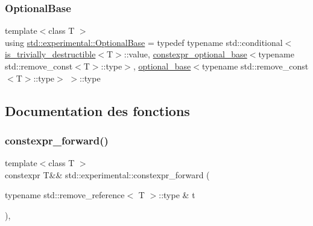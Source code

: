 \subsubsection{\texorpdfstring{Optional\+Base}{OptionalBase}}
{\footnotesize\ttfamily template$<$class T $>$ \\
using \hyperlink{namespacestd_1_1experimental_a33aa5e258a2b0762197365c1ef3f90aa}{std\+::experimental\+::\+Optional\+Base} = typedef typename std\+::conditional$<$ \hyperlink{namespacestd_1_1experimental_a481cc29b2f00961d0afc189e6e90f739}{is\+\_\+trivially\+\_\+destructible}$<$T$>$\+::value, \hyperlink{structstd_1_1experimental_1_1constexpr__optional__base}{constexpr\+\_\+optional\+\_\+base}$<$typename std\+::remove\+\_\+const$<$T$>$\+::type$>$, \hyperlink{structstd_1_1experimental_1_1optional__base}{optional\+\_\+base}$<$typename std\+::remove\+\_\+const$<$T$>$\+::type$>$ $>$\+::type}



\subsection{Documentation des fonctions}
\mbox{\label{namespacestd_1_1experimental_ad6c79ef527ee25f0a6295128c4b51f89}} 
\subsubsection{\texorpdfstring{constexpr\+\_\+forward()}{constexpr\_forward()}\hspace{0.1cm}{\footnotesize\ttfamily [1/2]}}
{\footnotesize\ttfamily template$<$class T $>$ \\
constexpr T\&\& std\+::experimental\+::constexpr\+\_\+forward (\begin{DoxyParamCaption}\item[{typename std\+::remove\+\_\+reference$<$ T $>$\+::type \&}]{t }\end{DoxyParamCaption})\hspace{0.3cm}{\ttfamily [inline]}, {\ttfamily [noexcept]}}

\mbox{\label{namespacestd_1_1experimental_a9bcca6a02f6e3005b3180962429c6feb}} 
